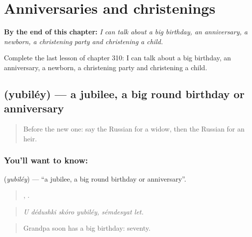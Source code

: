 
\chapter{Anniversaries and christenings}
\label{ch:ru-anniversaries-and-christenings}

\begin{chapteropening}
\textbf{By the end of this chapter:} \emph{I can talk about a big birthday, an anniversary, a newborn, a christening party and christening a child.}

Complete the last lesson of chapter 310: I can talk about a big birthday, an anniversary, a newborn, a christening party and christening a child.
\end{chapteropening}

\section[\texorpdfstring{\ru{юбилей} (yubiléy)}{юбилей (yubiléy)}]{ (yubiléy) — a jubilee, a big round birthday or anniversary}

\label{lesson:RU-C310-yubiley}



\begin{quote}
Before the new one: say the Russian for a widow, then the Russian for an heir.
\end{quote}

\subsection*{You'll want to know: }
\textbf{} (\emph{yubiléy}) — \textquotedblleft{}a jubilee, a big round birthday or anniversary\textquotedblright{}.

\begin{quote}
   ,  .
\end{quote}

\begin{quote}
\emph{U dédushki skóro yubiléy, sémdesyat let.}
\end{quote}

\begin{quote}
Grandpa soon has a big birthday: seventy.
\end{quote}

